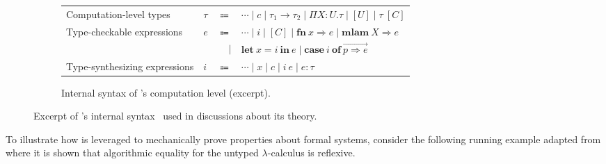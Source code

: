 \begin{figure}
\begin{subfigure}{\linewidth}
\begin{tabular}{p{5.5cm} >{\raggedleft}p{1cm} r l}
Computation-level types & $\tau$ & $\Coloneqq$ & $\cdots \mid c \mid \tau_1 \to \tau_2 \mid \Pi X{:}U. \tau \mid [U] \mid \tau\ [C]$\\
Type-checkable expressions & $e$ & $\Coloneqq$ & $\cdots \mid i \mid [C] \mid \mathbf{fn}\ x \Rightarrow e \mid \mathbf{mlam}\ X \Rightarrow e$ \\
& & $|$ & $\mathbf{let}\ x = i\ \mathbf{in}\ e \mid \mathbf{case}\ i\ \mathbf{of}\ \overrightarrow{p \Rightarrow e}$\\
Type-synthesizing expressions & $i$ & $\Coloneqq$ & $\cdots \mid x \mid c \mid i \ e \mid e : \tau$
\end{tabular}
\caption{Internal syntax of \Beluga's computation level (excerpt).}
\end{subfigure}
\caption[Excerpt of \Beluga's internal syntax]{%
Excerpt of \Beluga's internal syntax~\cite{nanevski2008contextual, germain2010implementation, cave2013first, ferreira2013compiling} used in discussions about its theory.
}
\label{figure:internal-syntax}
\end{figure}

\clearpage

To illustrate how \Beluga is leveraged to mechanically prove properties about formal systems, consider the following running example adapted from \cite{felty2010reasoning} where it is shown that algorithmic equality for the untyped $\lambda$-calculus is reflexive.

